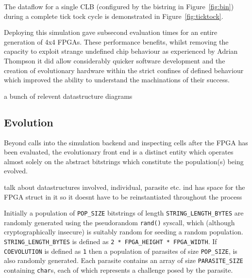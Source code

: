 The dataflow for a single CLB (configured
by the bistring in Figure~\ref{fig:bin}) during a complete tick tock cycle is demonstrated
in Figure~\ref{fig:ticktock}.

Deploying this simulation gave subsecond evaluation times for an entire generation of
4x4 FPGAs. These performance benefits, whilst removing the capacity to exploit
strange undefined chip behaviour as experienced by Adrian Thompson\cite{10.1007/3-540-63173-9_61}
it did allow considerably quicker software development and the creation of
evolutionary hardware within the strict confines of defined behaviour which
improved the ability to understand the machinations of their success.

\todo a bunch of relevent datastructure diagrams

\subsection{Evolution}
Beyond calls into the simulation backend and inspecting cells after the FPGA
has been evaluated, the evolutionary front end is a distinct entity which operates
almost solely on the abstract bitstrings which constitute the population(s)
being evolved.

\todo talk about datastructures involved, individual, parasite etc. ind has space
for the FPGA struct in it so it doesnt have to be reinstantiated throughout the
process

Initially a population of \texttt{POP\_SIZE} bitstrings of length \texttt{STRING\_LENGTH\_BYTES}
are randomly generated using the pseudorandom \texttt{rand()} syscall, which
(although cryptographically insecure) is suitably random for seeding a random
population. \texttt{STRING\_LENGTH\_BYTES} is defined as \texttt{2 * FPGA\_HEIGHT * FPGA\_WIDTH}.
If \texttt{COEVOLUTION} is defined as \texttt{1} then a population of
parasites of size \texttt{POP\_SIZE}, is also randomly generated. Each parasite
contains an array of size \texttt{PARASITE\_SIZE} containing \texttt{char}s, each of which represents a
challenge posed by the parasite.

